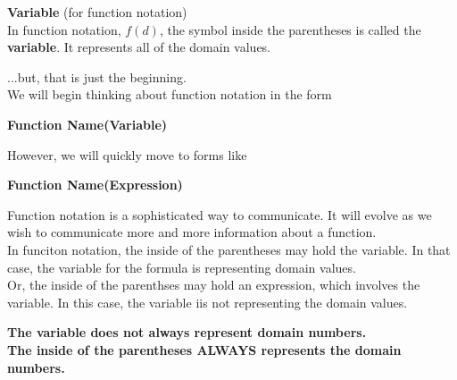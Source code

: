 \documentclass{ximera}
\begin{document}
\begin{definition}  \textbf{\textcolor{green!50!black}{Variable}} (for function notation) \\ 


In function notation, $f(d)$, the symbol inside the parentheses is called the \textbf{variable}. It represents all of the domain values.

\end{definition}



...but, that is just the beginning. \\









We will begin thinking about function notation in the form 

\begin{center}

\textbf{\textcolor{red!90!black}{Function Name(Variable)}}

\end{center}


However, we will quickly move to forms like


\begin{center}

\textbf{\textcolor{red!90!black}{Function Name(Expression)}}

\end{center}




Function notation is a sophisticated way to communicate.  It will evolve as we wish to communicate more and more information about a function. \\

In funciton notation, the inside of the parentheses may hold the variable.  In that case, the variable for the formula is representing domain values. \\

Or, the inside of the parenthses may hold an expression, which involves the variable.  In this case, the variable iis not representing the domain values. \\


 
\begin{center}

\textbf{\textcolor{blue!55!black}{The variable does not always represent domain numbers.}} \\

\textbf{\textcolor{purple!85!blue}{The inside of the parentheses ALWAYS represents the domain numbers.}}


\end{center}
\end{document}
